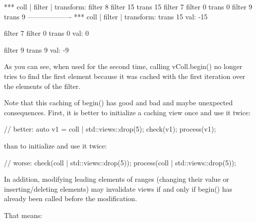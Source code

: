 {\footnotesize
\begin{shell}
*** coll | filter | transform:
filter 8
filter 15
trans 15
filter 7
filter 0
trans 0
filter 9
trans 9
-------------------
*** coll | filter | transform:
trans 15
val: -15

filter 7
filter 0
trans 0
val: 0

filter 9
trans 9
val: -9
\end{shell}
}

As you can see, when used for the second time, calling vColl.begin() no longer tries to find the first element because it was cached with the first iteration over the elements of the filter.

Note that this caching of begin() has good and bad and maybe unexpected consequences. First, it is better to initialize a caching view once and use it twice:

\begin{cpp}
// better:
auto v1 = coll | std::views::drop(5);
check(v1);
process(v1);
\end{cpp}

than to initialize and use it twice:

\begin{cpp}
// worse:
check(coll | std::views::drop(5));
process(coll | std::views::drop(5));
\end{cpp}

In addition, modifying leading elements of ranges (changing their value or inserting/deleting elements) may invalidate views if and only if begin() has already been called before the modification.

That means:

